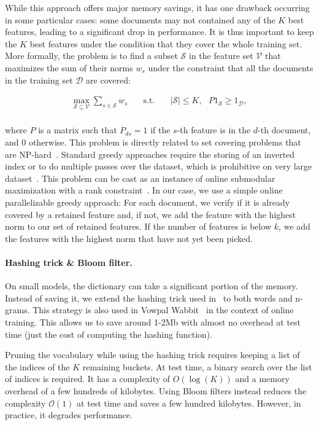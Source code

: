 While this approach offers major memory savings, it has one drawback occurring in some particular cases: some documents may not contained any of the $K$ best features, leading to a significant drop in performance. It is thus important to keep the $K$ best features under the condition that they cover the whole training set.  More formally, the problem is to find a subset ${\mathcal S}$ in the feature set ${\mathcal V}$ that maximizes the sum of their norms $w_s$ under the constraint that all the documents in the training set ${\mathcal D}$ are covered:

\begin{eqnarray*}
\max_{{\mathcal S}\subseteq \mathcal V} \sum_{s\in \mathcal S} w_s &\textrm{~~~s.t.~~~} & |{\mathcal S}|\le K,~~~P1_{\mathcal S}\ge 1_{\mathcal D},\\
\end{eqnarray*}

where $P$ is a matrix such that $P_{ds}=1$ if the $s$-th feature is in the $d$-th document, and $0$ otherwise. This problem is directly related to set covering problems that are NP-hard~\citep{feige1998threshold}. Standard greedy approaches require the storing of an inverted index or to do multiple passes over the dataset, which is prohibitive on very large dataset~\citep{chierichetti2010max}. This problem can be cast as an instance of online submodular maximization with a rank constraint~\citep{badanidiyuru2014streaming,bateni2010submodular}.  In our case, we use a simple online parallelizable greedy approach: For each document, we verify if it is already covered by a retained feature and, if not, we add the feature with the highest norm to our set of retained features. If the number of features is below $k$, we add the features with the highest norm that have not yet been picked. 

\paragraph{Hashing trick \& Bloom filter.} On small models, the dictionary can take a significant portion of the memory. Instead of saving it, we extend the hashing trick used in~\cite{J16} to both words and n-grams.  This strategy is also used in Vowpal Wabbit~\citep{A14} in the context of online training. This allows us to save around 1-2Mb with almost no overhead at test time (just the cost of computing the hashing function).

Pruning the vocabulary while using the hashing trick requires keeping a list of the indices of the $K$ remaining buckets.  At test time, a binary search over the list of indices is required. It has a complexity of $O(\log(K))$ and a memory overhead of a few hundreds of kilobytes.  Using Bloom filters instead reduces the complexity ${\mathcal O}(1)$ at test time and saves a few hundred kilobytes. However, in practice, it degrades performance.

